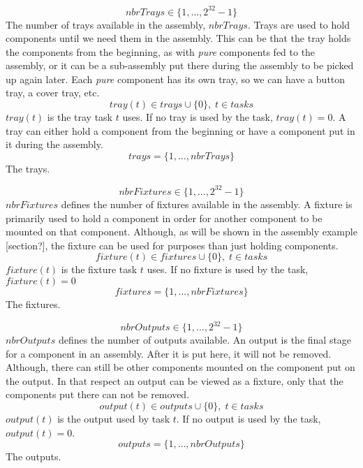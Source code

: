 \documentclass[10pt,a4paper]{report}
\begin{document}
\begin{equation}\label{eq:4}
nbrTrays \in \{1 , \ldots , 2^{32}-1\}
\end{equation}
The number of trays available in the assembly, $nbrTrays$. Trays are used to hold components until we need them in the assembly. This can be that the tray holds the components from the beginning, as with \emph{pure} components fed to the assembly, or it can be a sub-assembly put there during the assembly to be picked up again later. Each \emph{pure} component has its own tray, so we can have a button tray, a cover tray, etc.
\begin{equation}\label{eq:22}
tray(t) \in trays \cup \{0\}, \; t \in tasks
\end{equation}
$tray(t)$ is the tray task $t$ uses. If no tray is used by the task, $tray(t) = 0$. A tray can either hold a component from the beginning or have a component put in it during the assembly.
\begin{equation}\label{eq:14}
trays = \{1 , \ldots , nbrTrays\}\end{equation}
The trays.

\begin{equation}\label{eq:5}
nbrFixtures \in \{1 , \ldots , 2^{32}-1\}
\end{equation}
$nbrFixtures$ defines the number of fixtures available in the assembly. A fixture is primarily used to hold a component in order for another component to be mounted on that component. Although, as will be shown in the assembly example [section?], the fixture can be used for purposes than just holding components.
\begin{equation}\label{eq:24}
fixture(t) \in fixtures \cup \{0\}, \; t \in tasks
\end{equation}
$fixture(t)$ is the fixture task $t$ uses. If no fixture is used by the task, $fixture(t) = 0$
\begin{equation}\label{eq:15}
fixtures = \{1 , \ldots , nbrFixtures\}\end{equation}
The fixtures.

\begin{equation}\label{eq:7}
nbrOutputs \in \{1 , \ldots , 2^{32}-1\}
\end{equation}
$nbrOutputs$ defines the number of outputs available. An output is the final stage for a component in an assembly. After it is put here, it will not be removed. Although, there can still be other components mounted on the component put on the output. In that respect an output can be viewed as a fixture, only that the components put there can not be removed.
\begin{equation}\label{eq:23}
output(t) \in outputs \cup \{0\}, \; t \in tasks
\end{equation}
$output(t)$ is the output used by task $t$. If no output is used by the task, $output(t) = 0$.
\begin{equation}\label{eq:16}
outputs = \{1 , \ldots , nbrOutputs\}\end{equation}
The outputs.
\end{document}
